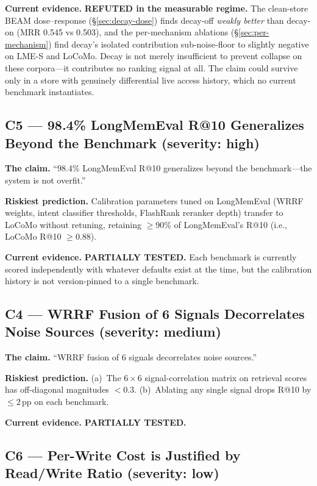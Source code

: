 \documentclass[11pt]{article}
\begin{document}
\textbf{Current evidence.} \textbf{REFUTED in the measurable
regime.}  The clean-store BEAM dose--response
(\S\ref{sec:decay-dose}) finds decay-off \emph{weakly better} than
decay-on (MRR 0.545 vs 0.503), and the per-mechanism ablations
(\S\ref{sec:per-mechanism}) find decay's isolated contribution
sub-noise-floor to slightly negative on LME-S and LoCoMo.  Decay is
not merely insufficient to prevent collapse on these corpora---it
contributes no ranking signal at all.  The claim could survive only
in a store with genuinely differential live access history, which
no current benchmark instantiates.

\subsection{C5 --- 98.4\% LongMemEval R@10 Generalizes Beyond the Benchmark (severity: high)}
\label{app:popper-c5}

\textbf{The claim.} ``98.4\% LongMemEval R@10 generalizes beyond
the benchmark---the system is not overfit.''

\textbf{Riskiest prediction.}  Calibration parameters tuned on
LongMemEval (WRRF weights, intent classifier thresholds, FlashRank
reranker depth) transfer to LoCoMo without retuning, retaining
$\ge 90\%$ of LongMemEval's R@10 (i.e., LoCoMo R@10 $\ge 0.88$).

\textbf{Current evidence.} \textbf{PARTIALLY TESTED.}  Each
benchmark is currently scored independently with whatever defaults
exist at the time, but the calibration history is not version-pinned
to a single benchmark.

\subsection{C4 --- WRRF Fusion of 6 Signals Decorrelates Noise Sources (severity: medium)}
\label{app:popper-c4}

\textbf{The claim.} ``WRRF fusion of 6 signals decorrelates noise
sources.''

\textbf{Riskiest prediction.}  (a)~The $6 \times 6$
signal-correlation matrix on retrieval scores has off-diagonal
magnitudes $< 0.3$.  (b)~Ablating any single signal drops R@10 by
$\le 2$\,pp on each benchmark.

\textbf{Current evidence.} \textbf{PARTIALLY TESTED.}

\subsection{C6 --- Per-Write Cost is Justified by Read/Write Ratio (severity: low)}
\label{app:popper-c6}
\end{document}
